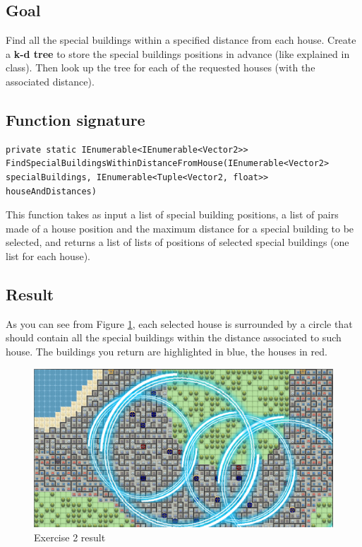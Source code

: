 \documentclass[10pt,a4paper]{article}
\begin{document}
\subsection*{Goal}
Find all the special buildings within a specified distance from each house. Create a \textbf{k-d tree} to store the special buildings positions in advance (like explained in class). Then look up the tree for each of the requested houses (with the associated distance).

\subsection*{Function signature} 
\begin{lstlisting}
private static IEnumerable<IEnumerable<Vector2>> FindSpecialBuildingsWithinDistanceFromHouse(IEnumerable<Vector2> specialBuildings, IEnumerable<Tuple<Vector2, float>> houseAndDistances)
\end{lstlisting}

\noindent
This function takes as input a list of special building positions, a list of pairs made of a house position and the maximum distance for a special building to be selected, and returns a list of lists of positions of selected special buildings (one list for each house).\\

\subsection*{Result}
As you can see from Figure \ref{img:Ex2}, each selected house is surrounded by a circle that should contain all the special buildings within the distance associated to such house. The buildings you return are highlighted in blue, the houses in red.

\begin{figure}[!h]
\centering
\includegraphics[scale=0.25]{img/exercise2}
\caption{Exercise 2 result}
\label{img:Ex2}
\end{figure}
\end{document}
